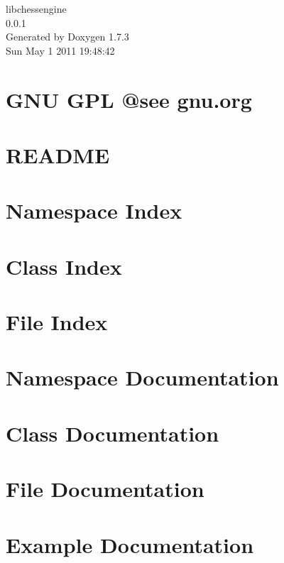 \documentclass[a4paper]{book}
\begin{document}
\hypersetup{pageanchor=false}
\begin{titlepage}
\vspace*{7cm}
\begin{center}
{\Large libchessengine \\[1ex]\large 0.0.1 }\\
\vspace*{1cm}
{\large Generated by Doxygen 1.7.3}\\
\vspace*{0.5cm}
{\small Sun May 1 2011 19:48:42}\\
\end{center}
\end{titlepage}
\clearemptydoublepage
{}
\tableofcontents
\clearemptydoublepage
{}
\hypersetup{pageanchor=true}
\chapter{GNU GPL @see gnu.org}
\label{index}\hypertarget{index}{}
\chapter{README}
\label{README}
\hypertarget{README}{}

\chapter{Namespace Index}

\chapter{Class Index}

\chapter{File Index}

\chapter{Namespace Documentation}

\chapter{Class Documentation}





\chapter{File Documentation}





\chapter{Example Documentation}

\printindex
\end{document}
